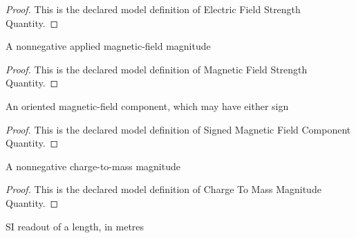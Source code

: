 \begin{proof}
  This is the declared model definition of Electric Field Strength Quantity.
\end{proof}
\begin{definition}
  \label{def:physics:phyx-mini-0561:phyxminiproblems-problemphyxmini0561-magneticfieldstrengthquantity}
  A nonnegative applied magnetic-field magnitude
\end{definition}
\begin{proof}
  This is the declared model definition of Magnetic Field Strength Quantity.
\end{proof}
\begin{definition}
  \label{def:physics:phyx-mini-0561:phyxminiproblems-problemphyxmini0561-signedmagneticfieldcomponentquantity}
  An oriented magnetic-field component, which may have either sign
\end{definition}
\begin{proof}
  This is the declared model definition of Signed Magnetic Field Component Quantity.
\end{proof}
\begin{definition}
  \label{def:physics:phyx-mini-0561:phyxminiproblems-problemphyxmini0561-chargetomassmagnitudequantity}
  A nonnegative charge-to-mass magnitude
\end{definition}
\begin{proof}
  This is the declared model definition of Charge To Mass Magnitude Quantity.
\end{proof}
\begin{definition}
  \label{def:physics:phyx-mini-0561:phyxminiproblems-problemphyxmini0561-lengthinmeters}
  SI readout of a length, in metres
\end{definition}
